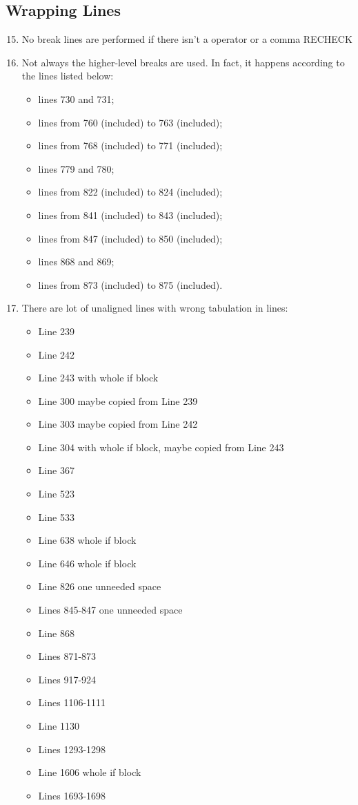 \subsection{Wrapping Lines}
\begin{enumerate}
	\setcounter{enumi}{14}
	\item No break lines are performed if there isn't a operator or a comma RECHECK
	\item Not always the higher-level breaks are used. In fact, it happens according to the lines listed below:
	    \begin{itemize}
	        \item lines 730 and 731;
	        \item lines from 760 (included) to 763 (included);
	        \item lines from 768 (included) to 771 (included);
	        \item lines 779 and 780;
	        \item lines from 822 (included) to 824 (included);
	        \item lines from 841 (included) to 843 (included);
	        \item lines from 847 (included) to 850 (included);
	        \item lines 868 and 869;
	        \item lines from 873 (included) to 875 (included).
	    \end{itemize}
	\item There are lot of unaligned lines with wrong tabulation in lines:
	\begin{itemize}
		\item Line 239
		\item Line 242
		\item Line 243 with whole if block
		\item Line 300 maybe copied from Line 239
		\item Line 303 maybe copied from Line 242
		\item Line 304 with whole if block, maybe copied from Line 243
		\item Line 367
		\item Line 523
		\item Line 533
		\item Line 638 whole if block
		\item Line 646 whole if block
		\item Line 826 one unneeded space
		\item Lines 845-847 one unneeded space
		\item Line 868
		\item Lines 871-873
		\item Lines 917-924
		\item Lines 1106-1111
		\item Line 1130
		\item Lines 1293-1298
		\item Line 1606 whole if block
		\item Lines 1693-1698
	\end{itemize}
\end{enumerate}
